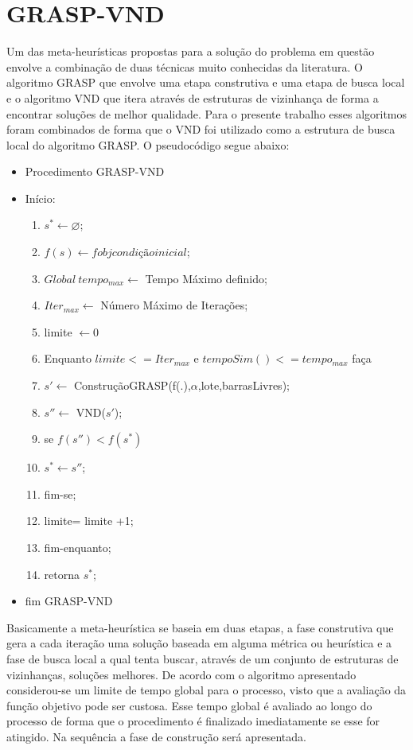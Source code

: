 \documentclass[12pt]{article}
\begin{document}
\section{GRASP-VND}

Um das meta-heurísticas propostas para a solução do problema em questão envolve a combinação de duas técnicas muito conhecidas da literatura. O  algoritmo GRASP  \cite{GRASP95} que envolve uma etapa construtiva e uma etapa de busca local e o algoritmo VND \cite{VND97} que itera através de estruturas de vizinhança de forma a encontrar soluções de melhor qualidade. Para o presente trabalho esses algoritmos foram combinados de forma que o VND foi utilizado como a estrutura de busca local do algoritmo GRASP. O pseudocódigo segue abaixo:
\begin{itemize}
	\item Procedimento GRASP-VND
	\item Início:
	\begin{enumerate}
		\item $s^* \leftarrow \varnothing$; 
		\item $f(s) \leftarrow fobj condição inicial$;
		\item $Global~tempo_{max} \leftarrow$ Tempo Máximo definido;
		\item $Iter_{max} \leftarrow$ Número Máximo de Iterações;
		\item limite $\leftarrow 0$ 
		\item Enquanto $limite <= Iter_{max}$ e $tempoSim() <= tempo_{max}$ faça
		\item \quad $s' \leftarrow$ ConstruçãoGRASP(f(.),$\alpha$,lote,barrasLivres);
		\item \quad $s'' \leftarrow$ VND($s'$); 
		\item \quad se $f(s'') < f(s^*)$
		\item \qquad  $s^* \leftarrow s''$;
		\item \quad fim-se;
		\item \quad limite= limite +1;
		\item fim-enquanto;
		\item retorna $s^*$;
	\end{enumerate}	
	\item fim GRASP-VND
\end{itemize}

Basicamente a meta-heurística se baseia em duas etapas, a fase construtiva que gera a cada iteração uma solução baseada em alguma métrica ou heurística e a fase de busca local a qual tenta buscar, através de um conjunto de estruturas de vizinhanças, soluções melhores. De acordo com o algoritmo apresentado considerou-se um limite de tempo global para o processo, visto que a avaliação da função objetivo pode ser custosa. Esse tempo global é avaliado ao longo do processo de forma que o procedimento é finalizado imediatamente se esse for atingido. Na sequência a fase de construção será apresentada.
\end{document}
